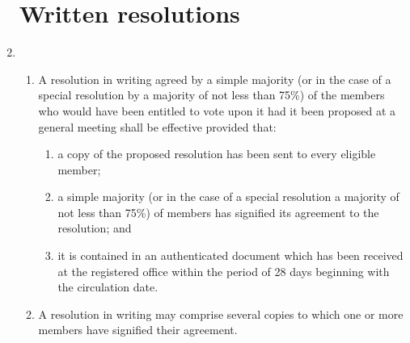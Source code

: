 \documentclass{article}
\begin{document}
\begin{enumerate}[label=\arabic*, start=23]
    \section{Written resolutions}
    \item \begin{enumerate}[label=(\arabic*)]
        \item A resolution in writing agreed by a simple majority (or in the
        case of a special resolution by a majority of not less than 75\%)
        of the members who would have been entitled to vote upon it
        had it been proposed at a general meeting shall be effective
        provided that:
        \begin{enumerate}[label=(\alph*)]
            \item a copy of the proposed resolution has been sent to every
            eligible member;
            \item a simple majority (or in the case of a special resolution a
            majority of not less than 75\%) of members has signified
            its agreement to the resolution; and
            \item it is contained in an authenticated document which has
            been received at the registered office within the period of
            28 days beginning with the circulation date.
        \end{enumerate}
        \item A resolution in writing may comprise several copies to which
        one or more members have signified their agreement.
    \end{enumerate}
    

\end{enumerate}
\end{document}
